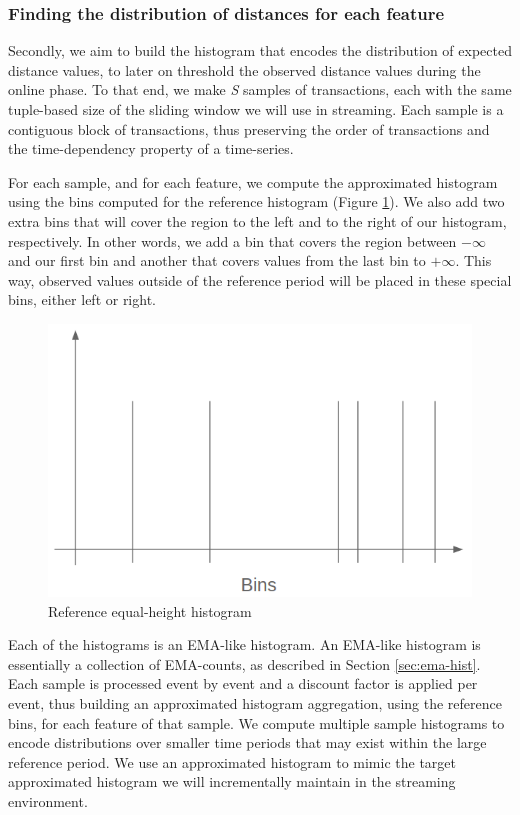 \subsubsection*{Finding the distribution of distances for each feature} \label{sec:sampling-batch}
Secondly, we aim to build the histogram that encodes the distribution of expected distance values, to later on threshold the observed distance values during the online phase. To that end, we make \textit{S} samples of transactions, each with the same tuple-based size of the sliding window we will use in streaming. Each sample is a contiguous block of transactions, thus preserving the order of transactions and the time-dependency property of a time-series. 

For each sample, and for each feature, we compute the approximated histogram using the bins computed for the reference histogram (Figure \ref{fig:ref-hist-bins}). We also add two extra bins that will cover the region to the left and to the right of our histogram, respectively. In other words, we add a bin that covers the region between $-\infty$ and our first bin and another that covers values from the last bin to $+\infty$. This way, observed values outside of the reference period will be placed in these special bins, either left or right.

\begin{figure}[!htb]
    \begin{center}
      \includegraphics[scale=0.4]{figures/ref-bins.png}
      \caption[]{Reference equal-height histogram}
      \label{fig:ref-hist-bins}
    \end{center}
\end{figure}

Each of the histograms is an EMA-like histogram. An EMA-like histogram is essentially a collection of EMA-counts, as described in Section \ref{sec:ema-hist}. Each sample is processed event by event and a discount factor is applied per event, thus building an approximated histogram aggregation, using the reference bins, for each feature of that sample. We compute multiple sample histograms to encode distributions over smaller time periods that may exist within the large reference period. We use an approximated histogram to mimic the target approximated histogram we will incrementally maintain in the streaming environment.

